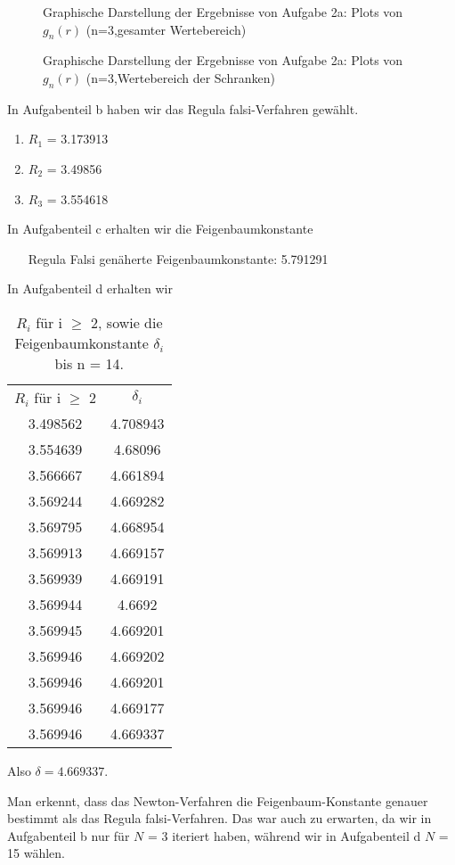 \begin{landscape}
	\begin{figure}
		\OverfullCenter{\texttt{[image: ../A2/2a\_n=3.pdf]}}
		\caption{Graphische Darstellung der Ergebnisse von Aufgabe 2a: Plots von $g_n(r)$ (n=3,gesamter Wertebereich)}
		\label{fig:2a_3}
	\end{figure}
\end{landscape}

\begin{landscape}
	\begin{figure}
		\OverfullCenter{\texttt{[image: ../A2/2a\_n=3\_schranken.pdf]}}
		\caption{Graphische Darstellung der Ergebnisse von Aufgabe 2a: Plots von $g_n(r)$ (n=3,Wertebereich der Schranken)}
		\label{fig:2a_3_schranken}
	\end{figure}
\end{landscape}
In Aufgabenteil b haben wir das Regula falsi-Verfahren gewählt.

\begin{enumerate}
\item $R_1$ = 3.173913
\item $R_2$ = 3.49856
\item $R_3$ = 3.554618
\end{enumerate}

In Aufgabenteil c erhalten wir die Feigenbaumkonstante
\begin{enumerate}
\item [Regula Falsi] genäherte Feigenbaumkonstante: 5.791291
\end{enumerate}

In Aufgabenteil d erhalten wir
\begin{table}[]
\centering
\caption{$R_i$ für i $\geq$ 2, sowie die Feigenbaumkonstante $\delta_i$ bis n = 14. }
\label{RDelta}
\begin{tabular}{cc}
$R_i$ für i $\geq$ 2 & $\delta_i$   \\
3.498562                     & 4.708943 \\
3.554639                     & 4.68096   \\
3.566667                     & 4.661894  \\
3.569244                     & 4.669282   \\
3.569795                     & 4.668954   \\
3.569913                     & 4.669157   \\
3.569939                     & 4.669191   \\
3.569944                     & 4.6692     \\
3.569945                     & 4.669201   \\
3.569946                     & 4.669202   \\
3.569946                     & 4.669201   \\
3.569946                     & 4.669177   \\
3.569946                     & 4.669337  \\
\end{tabular}
\end{table}

Also $\delta = 4.669337$.

Man erkennt, dass das Newton-Verfahren die Feigenbaum-Konstante genauer bestimmt als das Regula falsi-Verfahren. Das war auch zu erwarten, da wir in Aufgabenteil b nur für $N$ = 3 iteriert haben, während wir in Aufgabenteil d $N$ = 15 wählen.


